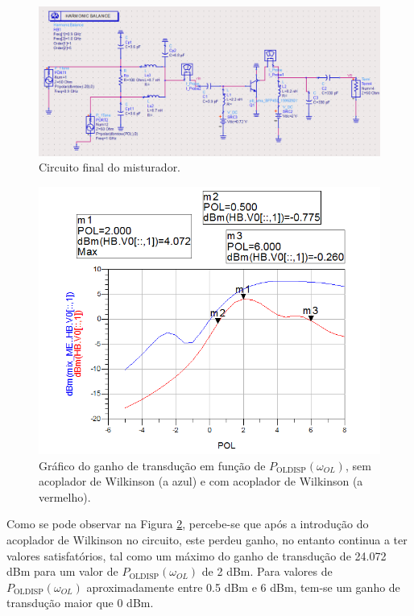 \documentclass[11pt]{article}
\numberwithin{equation}{section}
\begin{document}
\begin{figure}[h]
\centering
\includegraphics[keepaspectratio=true, scale=0.45]{exps/Circuito_3}
\vspace{-0.5em}
\caption{Circuito final do misturador.}
\vspace{-0.8em}
\label{fig:Circuito_3}
\end{figure}

\begin{figure}[h]
\centering
\includegraphics[keepaspectratio=true, scale=0.45]{exps/GT_3}
\vspace{-0.5em}
\caption{Gráfico do ganho de transdução em função de $ P_{\text{OLDISP}}\left(\omega_{OL}\right) $, sem acoplador de Wilkinson (a azul) e com acoplador de Wilkinson (a vermelho).}
\vspace{-0.8em}
\label{fig:GT_3}
\end{figure}

Como se pode observar na Figura \ref{fig:GT_3}, percebe-se que após a introdução do acoplador de Wilkinson no circuito, este perdeu ganho, no entanto continua a ter valores satisfatórios, tal como um máximo do ganho de transdução de 24.072 dBm para um valor de $ P_{\text{OLDISP}}\left(\omega_{OL}\right) $ de 2 dBm. Para valores de $ P_{\text{OLDISP}}\left(\omega_{OL}\right) $ aproximadamente entre 0.5 dBm e 6 dBm, tem-se um ganho de transdução maior que 0 dBm.
\end{document}
